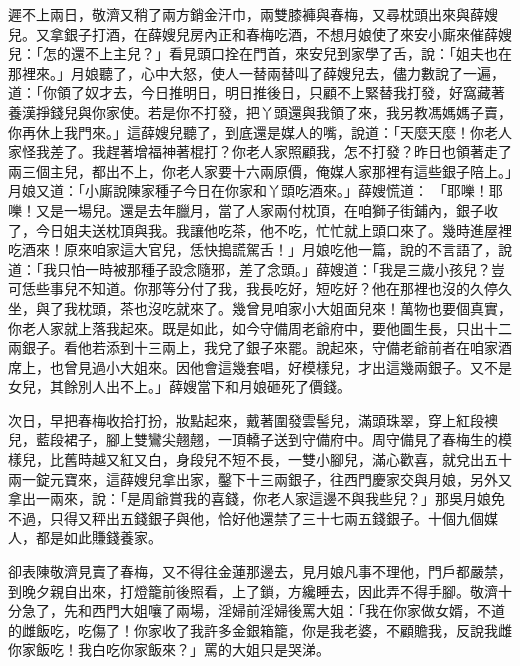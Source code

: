 遲不上兩日，敬濟又稍了兩方銷金汗巾，兩雙膝褲與春梅，又尋枕頭出來與薛嫂兒。又拿銀子打酒，在薛嫂兒房內正和春梅吃酒，不想月娘使了來安小廝來催薛嫂兒：「怎的還不上主兒？」看見頭口拴在門首，來安兒到家學了舌，說：「姐夫也在那裡來。」月娘聽了，心中大怒，使人一替兩替叫了薛嫂兒去，儘力數說了一遍，道：「你領了奴才去，今日推明日，明日推後日，只顧不上緊替我打發，好窩藏著養漢掙錢兒與你家使。若是你不打發，把丫頭還與我領了來，我另教馮媽媽子賣，你再休上我門來。」這薛嫂兒聽了，到底還是媒人的嘴，說道：「天麼天麼！你老人家怪我差了。我趕著增福神著棍打？你老人家照顧我，怎不打發？昨日也領著走了兩三個主兒，都出不上，你老人家要十六兩原價，俺媒人家那裡有這些銀子陪上。」月娘又道：「小廝說陳家種子今日在你家和丫頭吃酒來。」薛嫂慌道： 「耶嚛！耶嚛！又是一場兒。還是去年臘月，當了人家兩付枕頂，在咱獅子街鋪內，銀子收了，今日姐夫送枕頂與我。我讓他吃茶，他不吃，忙忙就上頭口來了。幾時進屋裡吃酒來！原來咱家這大官兒，恁快搗謊駕舌！」月娘吃他一篇，說的不言語了，說道：「我只怕一時被那種子設念隨邪，差了念頭。」薛嫂道：「我是三歲小孩兒？豈可恁些事兒不知道。你那等分付了我，我長吃好，短吃好？他在那裡也沒的久停久坐，與了我枕頭，茶也沒吃就來了。幾曾見咱家小大姐面兒來！萬物也要個真實，你老人家就上落我起來。既是如此，如今守備周老爺府中，要他圖生長，只出十二兩銀子。看他若添到十三兩上，我兌了銀子來罷。說起來，守備老爺前者在咱家酒席上，也曾見過小大姐來。因他會這幾套唱，好模樣兒，才出這幾兩銀子。又不是女兒，其餘別人出不上。」薛嫂當下和月娘砸死了價錢。

次日，早把春梅收拾打扮，妝點起來，戴著圍發雲髻兒，滿頭珠翠，穿上紅段襖兒，藍段裙子，腳上雙鸞尖翹翹，一頂轎子送到守備府中。周守備見了春梅生的模樣兒，比舊時越又紅又白，身段兒不短不長，一雙小腳兒，滿心歡喜，就兌出五十兩一錠元寶來，這薛嫂兒拿出家，鑿下十三兩銀子，往西門慶家交與月娘，另外又拿出一兩來，說：「是周爺賞我的喜錢，你老人家這邊不與我些兒？」那吳月娘免不過，只得又秤出五錢銀子與他，恰好他還禁了三十七兩五錢銀子。十個九個媒人，都是如此賺錢養家。

卻表陳敬濟見賣了春梅，又不得往金蓮那邊去，見月娘凡事不理他，門戶都嚴禁，到晚夕親自出來，打燈籠前後照看，上了鎖，方纔睡去，因此弄不得手腳。敬濟十分急了，先和西門大姐嚷了兩場，淫婦前淫婦後罵大姐：「我在你家做女婿，不道的雌飯吃，吃傷了！你家收了我許多金銀箱籠，你是我老婆，不顧贍我，反說我雌你家飯吃！我白吃你家飯來？」罵的大姐只是哭涕。

